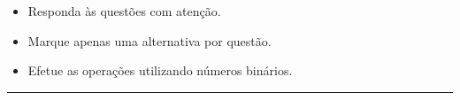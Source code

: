 \documentclass[a4paper,12pt]{article}
\begin{document}

\noindent
\begin{minipage}{\textwidth}
    \scriptsize

    \begin{itemize}[itemsep=0pt, topsep=0pt, parsep=0pt]
        \item Responda às questões com atenção.
        \item Marque apenas uma alternativa por questão.
        \item Efetue as operações utilizando números binários.
    \end{itemize}
\end{minipage}

\vspace{0.5cm}

\noindent\rule{\textwidth}{1pt}

\end{document}
